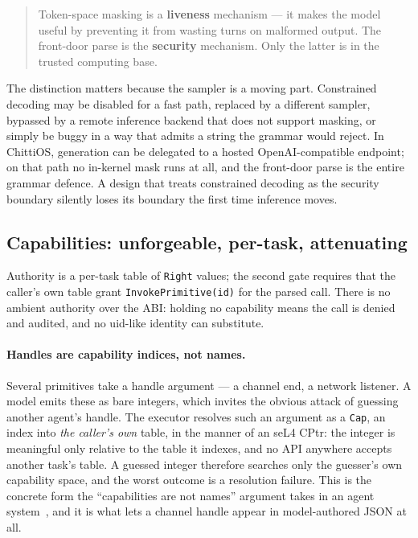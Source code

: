 \documentclass[11pt]{article}
\newcommand{\os}{ChittiOS}
\newcommand{\code}[1]{\texttt{#1}}
\begin{document}
\begin{quote}
Token-space masking is a \textbf{liveness} mechanism --- it makes the model
useful by preventing it from wasting turns on malformed output. The front-door
parse is the \textbf{security} mechanism. Only the latter is in the trusted
computing base.
\end{quote}

The distinction matters because the sampler is a moving part. Constrained
decoding may be disabled for a fast path, replaced by a different sampler,
bypassed by a remote inference backend that does not support masking, or
simply be buggy in a way that admits a string the grammar would reject. In
\os{}, generation can be delegated to a hosted OpenAI-compatible endpoint; on
that path no in-kernel mask runs at all, and the front-door parse is the
entire grammar defence. A design that treats constrained decoding as the
security boundary silently loses its boundary the first time inference moves.

\subsection{Capabilities: unforgeable, per-task, attenuating}
\label{sec:cap}

Authority is a per-task table of \code{Right} values; the second gate requires
that the caller's own table grant \code{InvokePrimitive(id)} for the parsed
call. There is no ambient authority over the ABI: holding no capability means
the call is denied and audited, and no uid-like identity can substitute.

\paragraph{Handles are capability indices, not names.} Several primitives take
a handle argument --- a channel end, a network listener. A model emits these as
bare integers, which invites the obvious attack of guessing another agent's
handle. The executor resolves such an argument as a \code{Cap}, an index into
\emph{the caller's own} table, in the manner of an seL4 CPtr: the integer is
meaningful only relative to the table it indexes, and no API anywhere accepts
another task's table. A guessed integer therefore searches only the guesser's
own capability space, and the worst outcome is a resolution failure. This is
the concrete form the ``capabilities are not names'' argument takes in an
agent system~\cite{miller2003myths}, and it is what lets a channel handle
appear in model-authored JSON at all.
\end{document}
